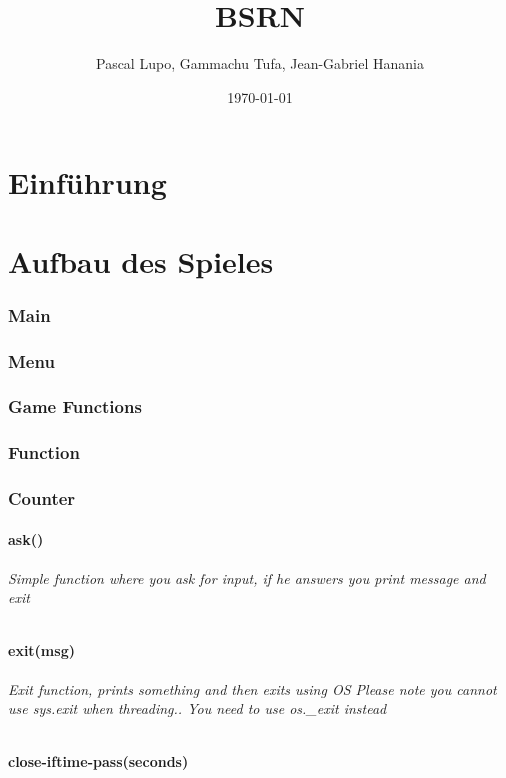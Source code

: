 \documentclass{article}
\title{BSRN}
\author{Pascal Lupo, Gammachu Tufa, Jean-Gabriel Hanania}
\date{\today}
\begin{document}
\maketitle
\tableofcontents



\newpage
\part{Einführung}
\part{Aufbau des Spieles}
\section{Main}
\section{Menu}
\section{Game Functions}
\section{Function}
\section{Counter}
\subsection{ask()}
\paragraph{Simple function where you ask for input, if he answers
    you print message and exit}
\subsection{exit(msg)}
\paragraph{ Exit function, prints something and then exits using OS
    Please note you cannot use sys.exit when threading..
    You need to use os._exit instead}
\subsection{close-iftime-pass(seconds)}
\end{document}
